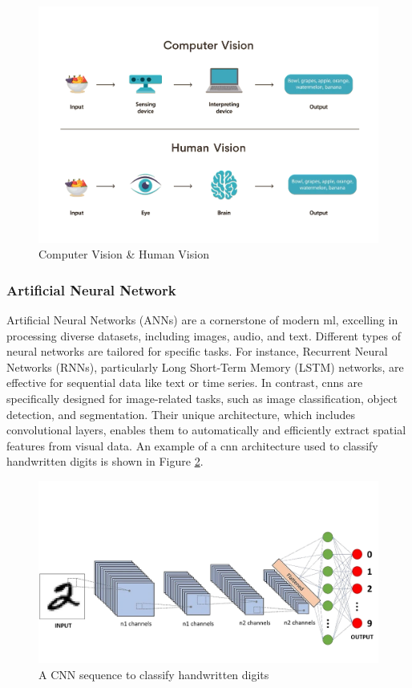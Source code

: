 \begin{figure}[h!]
    \centering
    \includegraphics[width=0.75\linewidth]{figures/theory/computer-vision.png}
    \caption[Computer Vision \& Human Vision]{Computer Vision \& Human Vision \cite{turing:computer-vision}}
    \label{fig:computer-vision}
\end{figure}

\subsubsection*{Artificial Neural Network}
\label{subsubsec:artificial-neural-network}

Artificial Neural Networks (ANNs) are a cornerstone of modern \gls{ml}, excelling in processing diverse datasets, including images, audio, and text. Different types of neural networks are tailored for specific tasks. For instance, Recurrent Neural Networks (RNNs), particularly Long Short-Term Memory (LSTM) networks, are effective for sequential data like text or time series. In contrast, \glspl{cnn} are specifically designed for image-related tasks, such as image classification, object detection, and segmentation. Their unique architecture, which includes convolutional layers, enables them to automatically and efficiently extract spatial features from visual data. An example of a \gls{cnn} architecture used to classify handwritten digits is shown in Figure \ref{fig:convolutional-neural-network}. \cite{geeksforgeeks:cnn} \\

\begin{figure}[h!]
    \centering
    \includegraphics[width=0.75\linewidth]{figures/theory/convolutional-neural-network.png}
    \caption[A CNN sequence to classify handwritten digits]{A CNN sequence to classify handwritten digits \cite{medium:cnn}}
    \label{fig:convolutional-neural-network}
\end{figure}

